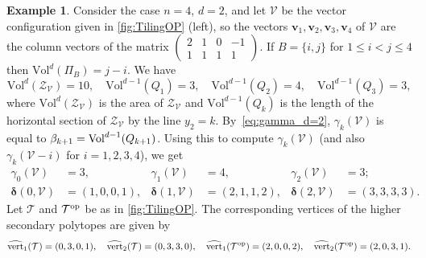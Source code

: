 \documentclass[11pt]{amsart}
\theoremstyle{plain}
\theoremstyle{definition}
\newtheorem{example}[theorem]{Example}
\def\v{{\bm{v}}}
\def\V{\mathcal{V}}
\def\ddelta{\bm{\delta}}
\def\Zon{\mathcal{Z}}
\def\ZV{\Zon_\V}
\def\Vol{\mathrm{Vol}}
\newcommand\wh[1]{\hstretch{2}{\hat{\hstretch{0.5}{#1}}}}
\def\vert{\mathrm{vert}}
\def\vertHSP{\wh\vert}
\def\vertHSP{\widehat{\vert}}
\def\VC{\V}
\def\Tcal{\mathcal{T}}
\def\Tiling{\Tcal}
\def\tile{\Pi}
\def\Voldd{\Vol^{d-1}}
\def\Vold{\Vol^d}
\def\VolX(#1){\Vol^d(\tile_{#1})}
\def\VolB{\VolX(B)}
\begin{document}
\def\vect#1#2#3#4{(#1,#2,#3,#4)}
\begin{example}\label{ex:gamma}
Consider the case $n=4$, $d=2$, and let $\VC$ be the vector configuration given in \cref{fig:TilingOP} (left), so the vectors $\v_1,\v_2,\v_3,\v_4$ of $\VC$ are the column vectors of the matrix $\begin{pmatrix}
2 & 1 & 0 &-1\\
1 & 1 & 1 & 1
\end{pmatrix}$. If $B=\{i,j\}$ for $1\leq i<j\leq 4$ then $\VolB=j-i$. We have
\[\Vold(\ZV)=10,\quad \Voldd(Q_1)=3,\quad \Voldd(Q_2)=4,\quad \Voldd(Q_3)=3,\]
	where $\Vold(\ZV)$ is the area of $\ZV$ and $\Voldd(Q_k)$ is the length of the horizontal section of $\ZV$ by the line $y_2=k$. By~\eqref{eq:gamma_d=2}, $\gamma_k(\VC)$ is equal to $\Ar_{k+1}=\Voldd(Q_{k+1})$.  Using this to compute $\gamma_k(\VC)$ (and also $\gamma_k(\VC - i)$ for $i=1,2,3,4$), we get
\begin{align*}
\gamma_0(\VC)&=3, &\gamma_1(\VC)&=4, &\gamma_2(\VC)&=3;\\
\ddelta(0,\VC)&=\vect1001,
&\ddelta(1,\VC)&=\vect2112,
&\ddelta(2,\VC)&=\vect3333. 
\end{align*}
Let $\Tiling$ and $\TilingOP$ be as in \cref{fig:TilingOP}. The corresponding vertices of the higher secondary polytopes are given by
\[\vertHSP_1(\Tiling)=\vect0301,\quad 
\vertHSP_2(\Tiling)=\vect0330,\quad 
\vertHSP_1(\TilingOP)=\vect2002,\quad 
\vertHSP_2(\TilingOP)=\vect2031. \]


\end{example}
\end{document}
